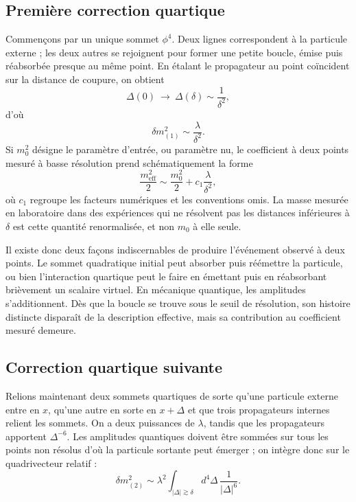 \subsection{Première correction quartique}

Commençons par un unique sommet \(\phi^4\). Deux lignes correspondent à la particule externe ; les deux autres se rejoignent pour former une petite boucle, émise puis réabsorbée presque au même point. En étalant le propagateur au point coïncident sur la distance de coupure, on obtient
\begin{equation}
\Delta(0)\ \longrightarrow\ \Delta(\delta)\sim\frac{1}{\delta^2},
\end{equation}
d’où
\begin{equation}
\delta m^2_{(1)}\sim\frac{\lambda}{\delta^2}.
\label{eq:one-loop-scalar-mass}
\end{equation}
Si \(m_0^2\) désigne le paramètre d’entrée, ou paramètre nu, le coefficient à deux points mesuré à basse résolution prend schématiquement la forme
\begin{equation}
\frac{m_{\mathrm{eff}}^2}{2}
\sim
\frac{m_0^2}{2}
+c_1\frac{\lambda}{\delta^2},
\label{eq:first-renormalized-mass}
\end{equation}
où \(c_1\) regroupe les facteurs numériques et les conventions omis. La masse mesurée en laboratoire dans des expériences qui ne résolvent pas les distances inférieures à \(\delta\) est cette quantité renormalisée, et non \(m_0\) à elle seule.

Il existe donc deux façons indiscernables de produire l’événement observé à deux points. Le sommet quadratique initial peut absorber puis réémettre la particule, ou bien l’interaction quartique peut le faire en émettant puis en réabsorbant brièvement un scalaire virtuel. En mécanique quantique, les amplitudes s’additionnent. Dès que la boucle se trouve sous le seuil de résolution, son histoire distincte disparaît de la description effective, mais sa contribution au coefficient mesuré demeure.

\subsection{Correction quartique suivante}

Relions maintenant deux sommets quartiques de sorte qu’une particule externe entre en \(x\), qu’une autre en sorte en \(x+\Delta\) et que trois propagateurs internes relient les sommets. On a deux puissances de \(\lambda\), tandis que les propagateurs apportent \(\Delta^{-6}\). Les amplitudes quantiques doivent être sommées sur tous les points non résolus d’où la particule sortante peut émerger ; on intègre donc sur le quadrivecteur relatif :
\begin{equation}
\delta m^2_{(2)}
\sim
\lambda^2
\int_{|\Delta|\gtrsim\delta}
d^4\Delta\,\frac{1}{|\Delta|^6}.
\label{eq:two-loop-power-count}
\end{equation}

